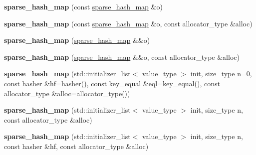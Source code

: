 \begin{DoxyCompactItemize}
\item 
{\bfseries sparse\+\_\+hash\+\_\+map} (const \hyperlink{classspp___1_1sparse__hash__map}{sparse\+\_\+hash\+\_\+map} \&o)\hypertarget{classspp___1_1sparse__hash__map_a29564c27fb040e530ac809f3e74144be}{}\label{classspp___1_1sparse__hash__map_a29564c27fb040e530ac809f3e74144be}

\item 
{\bfseries sparse\+\_\+hash\+\_\+map} (const \hyperlink{classspp___1_1sparse__hash__map}{sparse\+\_\+hash\+\_\+map} \&o, const allocator\+\_\+type \&alloc)\hypertarget{classspp___1_1sparse__hash__map_a92e24d7f2d55f78bef2b35f772879c59}{}\label{classspp___1_1sparse__hash__map_a92e24d7f2d55f78bef2b35f772879c59}

\item 
{\bfseries sparse\+\_\+hash\+\_\+map} (\hyperlink{classspp___1_1sparse__hash__map}{sparse\+\_\+hash\+\_\+map} \&\&o)\hypertarget{classspp___1_1sparse__hash__map_ad59b3620a0b5fc6caec9e4b09c3c825d}{}\label{classspp___1_1sparse__hash__map_ad59b3620a0b5fc6caec9e4b09c3c825d}

\item 
{\bfseries sparse\+\_\+hash\+\_\+map} (\hyperlink{classspp___1_1sparse__hash__map}{sparse\+\_\+hash\+\_\+map} \&\&o, const allocator\+\_\+type \&alloc)\hypertarget{classspp___1_1sparse__hash__map_a1dd1bce9282bc3e4a26013625e3217d5}{}\label{classspp___1_1sparse__hash__map_a1dd1bce9282bc3e4a26013625e3217d5}

\item 
{\bfseries sparse\+\_\+hash\+\_\+map} (std\+::initializer\+\_\+list$<$ value\+\_\+type $>$ init, size\+\_\+type n=0, const hasher \&hf=hasher(), const key\+\_\+equal \&eql=key\+\_\+equal(), const allocator\+\_\+type \&alloc=allocator\+\_\+type())\hypertarget{classspp___1_1sparse__hash__map_a50238728d9d5409914db138c5126b12f}{}\label{classspp___1_1sparse__hash__map_a50238728d9d5409914db138c5126b12f}

\item 
{\bfseries sparse\+\_\+hash\+\_\+map} (std\+::initializer\+\_\+list$<$ value\+\_\+type $>$ init, size\+\_\+type n, const allocator\+\_\+type \&alloc)\hypertarget{classspp___1_1sparse__hash__map_a949200312f74cb7e0b41dd287c0a3677}{}\label{classspp___1_1sparse__hash__map_a949200312f74cb7e0b41dd287c0a3677}

\item 
{\bfseries sparse\+\_\+hash\+\_\+map} (std\+::initializer\+\_\+list$<$ value\+\_\+type $>$ init, size\+\_\+type n, const hasher \&hf, const allocator\+\_\+type \&alloc)\hypertarget{classspp___1_1sparse__hash__map_a3774dd2ff9176bac955ce292c6a0fc3e}{}\label{classspp___1_1sparse__hash__map_a3774dd2ff9176bac955ce292c6a0fc3e}


\end{DoxyCompactItemize}
